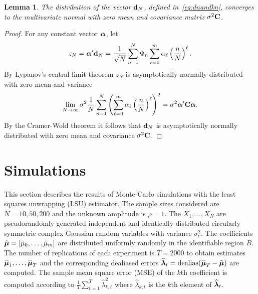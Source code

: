 \documentclass[aap]{imsart}
\newcommand{\var}{\operatorname{var}}
\newcommand{\covar}{\operatorname{covar}}
\newcommand{\dealias}{\operatorname{dealias}}
\newtheorem{lemma}{Lemma}
\begin{document}
\begin{lemma}\label{eq:convdn}
The distribution of the vector $\mathbf{d}_N$, defined in~\eqref{eq:dnandkn}, converges to the multivariate normal with zero mean and covariance matrix $\sigma^2\mathbf{C}$.
\end{lemma}
\begin{proof}
For any constant vector $\boldsymbol{\alpha}$, let
\[
z_N = \boldsymbol{\alpha}^\prime \mathbf{d}_N = \frac{1}{\sqrt{N}} \sum_{n=1}^{N} \Phi_n \sum_{\ell=0}^{m}\alpha_\ell\left( \frac{n}{N} \right)^\ell.
\]
By Lypanov's central limit theorem $z_N$ is asymptotically normally distributed with zero mean and variance
\[
\lim_{N\rightarrow\infty} \sigma^2 \frac{1}{N} \sum_{n=1}^{N}\left( \sum_{\ell=0}^{m}\alpha_\ell\left( \frac{n}{N} \right)^\ell \right)^2 = \sigma^2 \boldsymbol{\alpha}^\prime \mathbf{C} \boldsymbol{\alpha}.
\]
By the Cramer-Wold theorem it follows that $\mathbf{d}_N$ is asymptotically normally distributed with zero mean and covariance $\sigma^2 \mathbf{C}$. 
\end{proof}

\section{Simulations}\label{sec:simulations} 
 
This section describes the results of Monte-Carlo simulations with the least squares unwrapping (LSU) estimator.  The sample sizes considered are $N = 10, 50, 200$ and the unknown amplitude is $\rho = 1$.  The $X_1, \dots, X_N$ are pseudorandomly generated independent and identically distributed circularly symmetric complex Gaussian random variables with variance $\sigma_c^2$.  The coefficients $\tilde{\boldsymbol{\mu}} = [\tilde{\mu}_0, \dots, \tilde{\mu}_m]$ are distributed uniformly randomly in the identifiable region $B$.  The number of replications of each experiment is $T = 2000$ to obtain estimates $\widehat{\boldsymbol{\mu}}_1, \dots, \widehat{\boldsymbol{\mu}}_T$ and the corresponding dealiased errors $\widehat{\lambdabf}_t = \dealias(\widehat{\mubf}_T - \tilde{\mubf})$ are computed.  The sample mean square error (MSE) of the $k$th coefficient is computed according to $\tfrac{1}{T}\sum_{t=1}^T \widehat{\lambda}_{k,t}^2$ where $\widehat{\lambda}_{k,t}$ is the $k$th element of $\widehat{\boldsymbol{\lambda}}_t$. 
\end{document}
